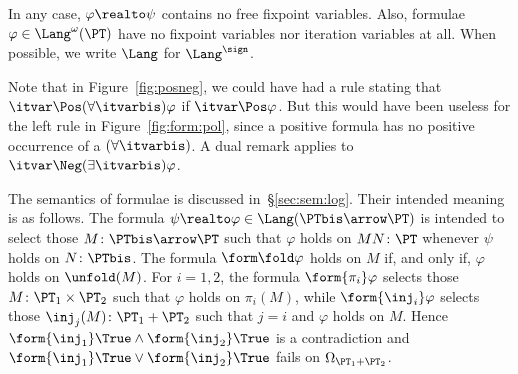 \noindent
In any case, %
$\varphi \realto \psi$
contains no free fixpoint variables.
%
Also, formulae $\varphi \in \Lang^{\omega}(\PT)$
have no fixpoint variables nor iteration variables at all.
%
When possible, we write $\Lang$ for $\Lang^\sign$.

Note that in Figure~\ref{fig:posneg}, we could have had a rule stating
that $\itvar \Pos (\forall \itvarbis)\varphi$ if $\itvar \Pos \varphi$.
But this would have been useless for the left rule in Figure~\ref{fig:form:pol},
since a positive formula has no positive occurrence of a $(\forall \itvarbis)$.
A dual remark applies to $\itvar \Neg (\exists \itvarbis)\varphi$.



The semantics of formulae is discussed in~\S\ref{sec:sem:log}.
Their intended meaning is as follows.
The formula $\psi \realto \varphi \in \Lang(\PTbis \arrow \PT)$
is intended to select those $M \colon \PTbis \arrow \PT$
such that $\varphi$ holds on $M N \colon \PT$ whenever $\psi$ holds on $N \colon \PTbis$.
%
The formula $\form\fold \varphi$ holds on $M$ if, and only if,
$\varphi$ holds on $\unfold(M)$.
%
For $i = 1,2$,
the formula $\form{\pi_i} \varphi$
selects those $M \colon \PT_1 \times \PT_2$
such that $\varphi$ holds on $\pi_i(M)$,
%
while $\form{\inj_i} \varphi$ selects those
$\inj_j(M) \colon \PT_1 + \PT_2$ such that $j = i$ and
$\varphi$ holds on $M$.
Hence
$\form{\inj_1}\True \land \form{\inj_2}\True$ is a contradiction
and
$\form{\inj_1}\True \lor \form{\inj_2}\True$ fails on $\Omega_{\PT_1 + \PT_2}$.





